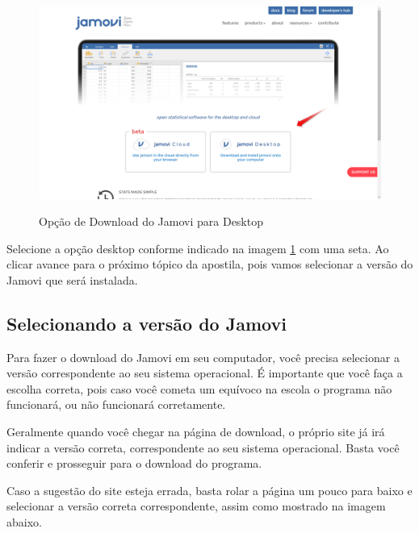 \begin{figure}[H]
  \centering
  \caption{Opção de Download do Jamovi para Desktop}
  \includegraphics[width=\textwidth]{imagens/cap_1/download_jamovi.png}
  \label{fig:download_jamovi}
\end{figure}

Selecione a opção desktop conforme indicado na imagem \ref{fig:download_jamovi} com uma seta. Ao clicar avance para o próximo tópico da apostila, pois vamos selecionar a versão do Jamovi que será instalada.

\subsection{Selecionando a versão do Jamovi}

Para fazer o download do Jamovi em seu computador, você precisa selecionar a versão correspondente ao seu sistema operacional. É importante que você faça a escolha correta, pois caso você cometa um equívoco na escola o programa não funcionará, ou não funcionará corretamente.

Geralmente quando você chegar na página de download, o próprio site já irá indicar a versão correta, correspondente ao seu sistema operacional. Basta você conferir e prosseguir para o download do programa.

Caso a sugestão do site esteja errada, basta rolar a página um pouco para baixo e selecionar a versão correta correspondente, assim como mostrado na imagem abaixo.


